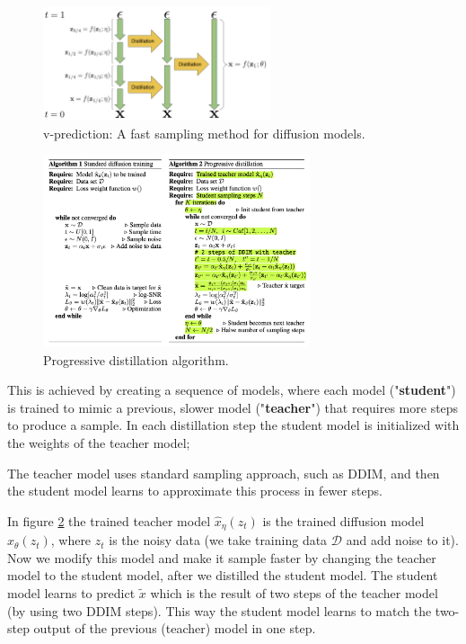 \begin{figure}
    \centering
    \includegraphics[width=0.6\textwidth]{images/imagen_video/v_prediction.png}
    \caption{v-prediction: A fast sampling method for diffusion models.}
    \label{fig:v_prediction}
\end{figure}

\begin{figure}
    \centering
    \includegraphics[width=0.7\textwidth]{images/imagen_video/progressive_distillation.png}
    \caption{Progressive distillation algorithm.}
    \label{fig:progressive_distillation}
\end{figure}

This is achieved by creating a sequence of models, where each model ("\textbf{student}") is trained to mimic a previous, slower model ("\textbf{teacher}") that requires more steps to produce a sample. In each distillation step the student model is initialized with the weights of the teacher model; 

The teacher model uses standard sampling approach, such as DDIM, and then the student model learns to approximate this process in fewer steps.

In figure \ref{fig:progressive_distillation} the trained teacher model $\hat{x}_{\eta} (z_t)$ is the trained diffusion model $\hat{x}_{\theta} (z_t)$, where $z_t$ is the noisy data (we take training data $\mathcal{D}$ and add noise to it). Now we modify this model and make it sample faster by changing the teacher model to the student model, after we distilled the student model. The student model learns to predict $\tilde{x}$ which is the result of two steps of the teacher model (by using two DDIM steps). This way the student model learns to match the two-step output of the previous (teacher) model in one step.

